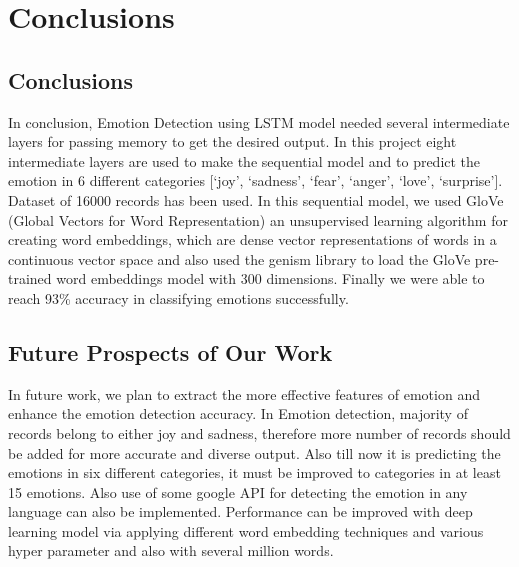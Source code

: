 \chapter{Conclusions}\label{ch:conclusion}

\section{Conclusions}
In conclusion, Emotion Detection using LSTM model needed several intermediate layers for passing memory to get the desired output. In this project eight intermediate layers are used to make the sequential model and to predict the emotion in 6 different categories [‘joy’, ‘sadness’, ‘fear’, ‘anger’, ‘love’, ‘surprise’]. Dataset of 16000 records has been used. In this sequential model, we used GloVe (Global Vectors for Word Representation) an unsupervised learning algorithm for creating word embeddings, which are dense vector representations of words in a continuous vector space and also used the genism library to load the GloVe pre-trained word embeddings model with 300 dimensions. Finally we were able to reach 93\% accuracy in classifying emotions successfully.

\section{Future Prospects of Our Work}
In future work, we plan to extract the more effective features of emotion and enhance the emotion detection accuracy. In Emotion detection, majority of records belong to either joy and sadness, therefore more number of records should be added for more accurate and diverse output. Also till now it is predicting the emotions in six different categories, it must be improved to categories in at least 15 emotions. Also use of some google API for detecting the emotion in any language can also be implemented. Performance can be improved with deep learning model via applying different word embedding techniques and various hyper parameter and also with several million words.
